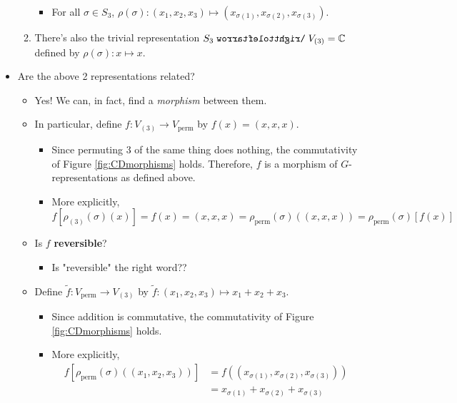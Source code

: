 \documentclass[../notes.tex]{subfiles}
\begin{document}
\begin{itemize}
\begin{enumerate}
        \begin{itemize}
            \item For all $\sigma\in S_3$, $\rho(\sigma):(x_1,x_2,x_3)\mapsto(x_{\sigma(1)},x_{\sigma(2)},x_{\sigma(3)})$.
        \end{itemize}
        \item There's also the trivial representation $S_3\acts V_{(3)}=\C$ defined by $\rho(\sigma):x\mapsto x$.
    \end{enumerate}
    \item Are the above 2 representations related?
    \begin{itemize}
        \item Yes! We can, in fact, find a \emph{morphism} between them.
        \item In particular, define $f:V_{(3)}\to V_\text{perm}$ by $f(x)=(x,x,x)$.
        \begin{itemize}
            \item Since permuting 3 of the same thing does nothing, the commutativity of Figure \ref{fig:CDmorphisms} holds. Therefore, $f$ is a morphism of $G$-representations as defined above.
            \item More explicitly,
            \begin{equation*}
                f[\rho_{(3)}(\sigma)(x)] = f(x)
                = (x,x,x)
                = \rho_\text{perm}(\sigma)((x,x,x))
                = \rho_\text{perm}(\sigma)[f(x)]
            \end{equation*}
        \end{itemize}
        \item Is $f$ \textbf{reversible}?
        \begin{itemize}
            \item Is "reversible" the right word??
        \end{itemize}
        \item Define $\tilde{f}:V_\text{perm}\to V_{(3)}$ by $\tilde{f}:(x_1,x_2,x_3)\mapsto x_1+x_2+x_3$.
        \begin{itemize}
            \item Since addition is commutative, the commutativity of Figure \ref{fig:CDmorphisms} holds.
            \item More explicitly,
            \begin{align*}
                f[\rho_\text{perm}(\sigma)((x_1,x_2,x_3))] &= f((x_{\sigma(1)},x_{\sigma(2)},x_{\sigma(3)}))\\
                &= x_{\sigma(1)}+x_{\sigma(2)}+x_{\sigma(3)}\\

\end{align*}
\end{itemize}
\end{itemize}
\end{itemize}
\end{document}
